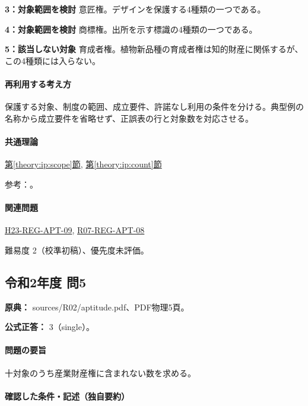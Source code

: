 \noindent\textbf{3：対象範囲を検討} 意匠権。デザインを保護する4種類の一つである。\par

\noindent\textbf{4：対象範囲を検討} 商標権。出所を示す標識の4種類の一つである。\par

\noindent\textbf{5：該当しない対象} 育成者権。植物新品種の育成者権は知的財産に関係するが、この4種類には入らない。\par

\paragraph{再利用する考え方} 保護する対象、制度の範囲、成立要件、許諾なし利用の条件を分ける。典型例の名称から成立要件を省略せず、正誤表の行と対象数を対応させる。

\paragraph{共通理論} \hyperref[theory:ip:scope]{第\ref*{theory:ip:scope}節}, \hyperref[theory:ip:count]{第\ref*{theory:ip:count}節}

\par 参考：\cite{ip_industrial_four,ip_broad_scope}。

\paragraph{関連問題} \hyperref[q:h23-reg-apt-09]{H23-REG-APT-09}, \hyperref[q:r07-reg-apt-08]{R07-REG-APT-08}

\par 難易度 2（校準初稿）、優先度未評価。

\subsection{令和2年度 問5}
\label{q:r02-reg-apt-05}

\noindent\textbf{原典：} sources/R02/aptitude.pdf、PDF物理5頁。

\textbf{公式正答：} 3（single）。

\paragraph{問題の要旨} 十対象のうち産業財産権に含まれない数を求める。

\paragraph{確認した条件・記述（独自要約）}\mbox{}\par


